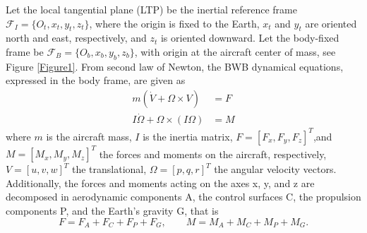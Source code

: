 \documentclass[10pt]{article}
\begin{document}
Let the local tangential plane (LTP) be the inertial reference frame
$\mathcal{F}_{I}=\{O_t,x_t,y_t,z_t\}$, where the origin is fixed to the
Earth, $x_t$ and $y_t$ are oriented north and east, respectively, and
$z_t$ is oriented downward. Let the body-fixed frame be
$\mathcal{F}_{B}=\{O_b,x_b,y_b,z_b\}$, with origin at the aircraft center
of mass, see Figure \ref{Figure1}. 
%
From second law of Newton, the BWB dynamical equations, expressed in the body frame, are given as 
%
\begin{align}
    m\left(\dot{V}+\Omega \times V\right)&=F\label{eq1F}\\
    I\dot{\Omega}+\Omega \times (I\Omega)&=M\label{eq2M}
\end{align}
where $m$ is the aircraft mass, $I$ is the inertia matrix, $F=[F_x, F_y, F_z]^T$,and $M=[M_x, M_y, M_z]^T$ the forces and moments on the aircraft, respectively, $V =[u, v, w]^T$ the translational, $\Omega =[p, q, r]^T$ the angular velocity vectors. 
%
Additionally, the forces and moments acting on the axes x, y, and z are decomposed in aerodynamic components A, the control surfaces C, the propulsion components P, and the Earth’s gravity G, that is  
\begin{equation}
    F = F_A + F_C + F_P + F_G,
    \qquad
    M = M_A + M_C + M_P + M_G.
\end{equation}
\end{document}
